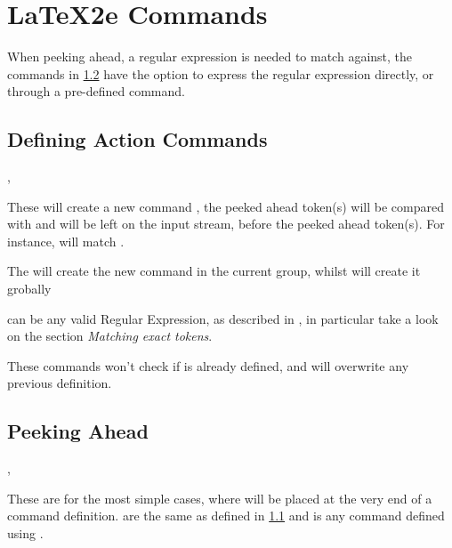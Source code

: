 \documentclass[10pt]{article}
\begin{document}
\section{LaTeX2e Commands}\label{2e-cmds}
When peeking ahead, a regular expression is needed to match against, the commands in \ref{peek-2e}  
have the option to express the regular expression directly,   or through a pre-defined command.


\subsection{Defining Action Commands}\label{cmd-def-2e}
\begin{codedescribe}{\xpeekSetCmd, \xpeekSetCmdGlobal}
\begin{codesyntax}%
\end{codesyntax}
These will create a new command , the peeked ahead token(s) will be compared with  and  will be left on the input stream, before the peeked ahead token(s). For instance,  will match \tsobj{\begin{envx}}.

The \tsobj{\xpeekSetCmd} will create the new command in the current group, whilst  \tsobj{\xpeekSetCmdGlobal} will create it grobally
\end{codedescribe}
\begin{tsremark}
   can be any valid Regular Expression, as described in \cite{expl3}, in particular take a look on the section \emph{Matching exact tokens}.
\end{tsremark}
\begin{tsremark}
  These commands won't check if  is already defined, and will overwrite any previous definition.
\end{tsremark}


\subsection{Peeking Ahead}\label{peek-2e}

\begin{codedescribe}{\xpeekTokCmd, \xpeekTok}
\begin{codesyntax}%
\end{codesyntax}
These are for the most simple cases, where \tsobj[code,sep=or]{\xpeekTokCmd,\xpeekTok} will be placed at the very end of a command definition.  are the same as defined in \ref{cmd-def-2e} and  is any command defined using \tsobj[code,sep=or]{\xpeekSetCmd, \xpeekSetCmdGlobal}.
\end{codedescribe}
\end{document}
